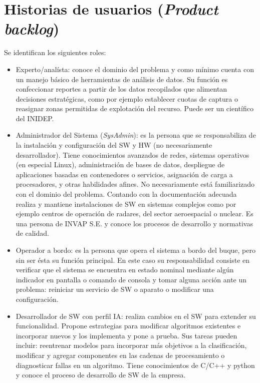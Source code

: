 \documentclass[11pt]{charter}
\begin{document}
\section{Historias de usuarios (\textit{Product backlog})}
\label{sec:backlog}

Se identifican los siguientes roles:

\begin{itemize}
	\item Experto/analísta: conoce el dominio del problema y como mínimo cuenta con un manejo básico de herramientas de análisis de datos. Su función es confeccionar reportes a partir de los datos recopilados que alimentan decisiones estratégicas, como por ejemplo establecer cuotas de captura o reasignar zonas permitidas de explotación del recurso. Puede ser un científico del INIDEP.
	\item Administrador del Sistema ({\em SysAdmin}): es la persona que se responsabiliza de la instalación y configuración del SW y HW (no necesariamente desarrollador). Tiene conocimientos avanzados de redes, sistemas operativos (en especial Linux), administración de bases de datos, despliegue de aplicaciones basadas en contenedores o servicios, asignación de carga a procesadores, y otras habilidades afines. No necesariamente está familiarizado con el dominio del problema. Contando con la documentación adecuada realiza y mantiene instalaciones de SW en sistemas complejos como por ejemplo centros de operación de radares, del sector aeroespacial o nuclear. Es una persona de INVAP S.E. y conoce los procesos de desarrollo y normativas de calidad.
	\item Operador a bordo: es la persona que opera el sistema a bordo del buque, pero sin ser ésta su función principal. En este caso su responsabilidad consiste en verificar que el sistema se encuentra en estado nominal mediante algún indicador en pantalla o comando de consola y tomar alguna acción ante un problema: reiniciar un servicio de SW o aparato o modificar una configuración. 
	\item Desarrollador de SW con perfil IA: realiza cambios en el SW para extender su funcionalidad. Propone estrategias para modificar algoritmos existentes e incorporar nuevos y los implementa y pone a prueba. Sus tareas pueden incluir: reentrenar modelos para incorporar más objetivos a la clasificación, modificar y agregar componentes en las cadenas de procesamiento o diagnosticar fallas en un algoritmo. Tiene conocimientos de C/C++ y python y conoce el proceso de desarrollo de SW de la empresa.
\end{itemize}
\end{document}
